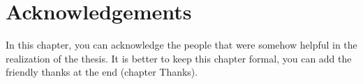 \chapter{Acknowledgements}
In this chapter, you can acknowledge the people that were somehow helpful in the realization of the thesis. It is better to keep this chapter formal, you can add the friendly thanks at the end (chapter Thanks).